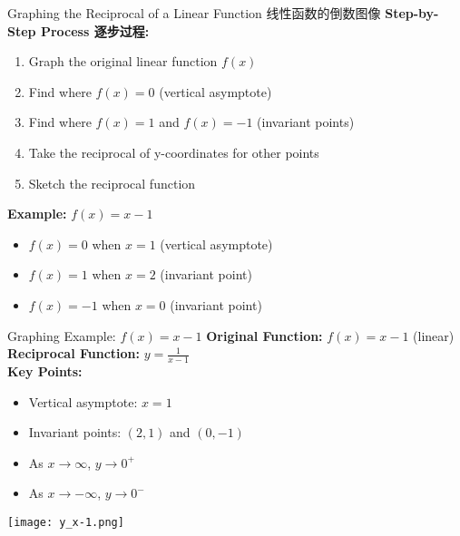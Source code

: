 \documentclass[aspectratio=169]{beamer}
\begin{document}
\begin{frame}{Graphing the Reciprocal of a Linear Function 线性函数的倒数图像}
    \footnotesize
    \textbf{Step-by-Step Process 逐步过程:}
    \begin{enumerate}
        \item Graph the original linear function $f(x)$
        \item Find where $f(x) = 0$ (vertical asymptote)
        \item Find where $f(x) = 1$ and $f(x) = -1$ (invariant points)
        \item Take the reciprocal of y-coordinates for other points
        \item Sketch the reciprocal function
    \end{enumerate}
    \vspace{1em}
    \textbf{Example:} $f(x) = x - 1$
    \begin{itemize}
        \item $f(x) = 0$ when $x = 1$ (vertical asymptote)
        \item $f(x) = 1$ when $x = 2$ (invariant point)
        \item $f(x) = -1$ when $x = 0$ (invariant point)
    \end{itemize}
\end{frame}

\begin{frame}{Graphing Example: $f(x) = x - 1$}
    \footnotesize
    \textbf{Original Function:} $f(x) = x - 1$ (linear)\\
    \textbf{Reciprocal Function:} $y = \frac{1}{x - 1}$\\
    \vspace{1em}
    \textbf{Key Points:}
    \begin{itemize}
        \item Vertical asymptote: $x = 1$
        \item Invariant points: $(2, 1)$ and $(0, -1)$
        \item As $x \to \infty$, $y \to 0^+$
        \item As $x \to -\infty$, $y \to 0^-$
    \end{itemize}
    \vspace{0.3em}
    \begin{center}
        \texttt{[image: y\_x-1.png]}
    \end{center}
\end{frame}
\end{document}
